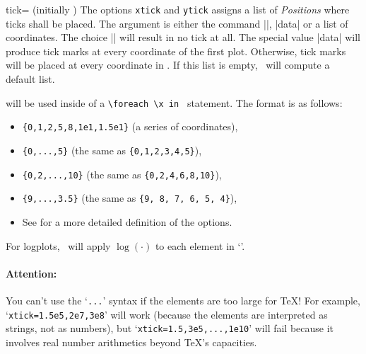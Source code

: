 \begin{pgfplotsxykey}{\x tick= (initially \marg{})}
The options \texttt{xtick} and \texttt{ytick} assigns a list of \emph{Positions} where ticks shall be placed. The argument is either the command |\empty|, |data| or a list of coordinates. The choice |\empty| will result in no tick at all. The special value |data| will produce tick marks at every coordinate of the first plot. Otherwise, tick marks will be placed at every coordinate in  . If this list is empty, \PGFPlots\ will compute a default list. 

 will be used inside of a \lstinline!\foreach \x in ! statement. The format is as follows:
\begin{itemize}
	\item \lstinline!{0,1,2,5,8,1e1,1.5e1}! (a series of coordinates),
	\item \lstinline!{0,...,5}! (the same as \lstinline!{0,1,2,3,4,5}!),
	\item \lstinline!{0,2,...,10}! (the same as \lstinline!{0,2,4,6,8,10}!),
	\item \lstinline!{9,...,3.5}! (the same as \lstinline!{9, 8, 7, 6, 5, 4}!),
	\item See \cite[Section~34]{tikz} for a more detailed definition of the options.
\end{itemize}
For logplots, \PGFPlots\ will apply $\log(\cdot)$ to each element in `'. 
\begin{codeexample}[]
\begin{tikzpicture}
	\begin{loglogaxis}[xtick={12,9897,1468864}]
	\plotcoords
	\end{loglogaxis}
\end{tikzpicture}
\end{codeexample}

\begin{codeexample}[]
\end{codeexample}

\paragraph{Attention:} You can't use the `\texttt{...}' syntax if the elements are too large for \TeX! For example, `\texttt{xtick=1.5e5,2e7,3e8}' will work (because the elements are interpreted as strings, not as numbers), but `\texttt{xtick=1.5,3e5,...,1e10}' will fail because it involves real number arithmetics beyond \TeX's capacities.
\vspace*{0.3cm}


\end{pgfplotsxykey}
